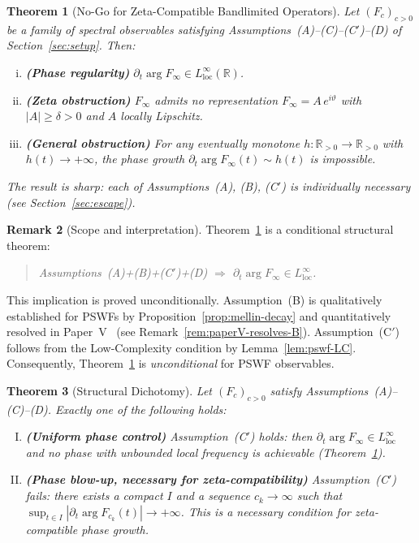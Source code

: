 \documentclass[12pt,a4paper]{amsart}
\newtheorem{theorem}{Theorem}[section]
\theoremstyle{definition}
\newtheorem{remark}[theorem]{Remark}
\begin{document}
\begin{theorem}[No-Go for Zeta-Compatible Bandlimited
Operators]
\label{thm:main}
Let $(F_c)_{c>0}$ be a family of spectral observables
satisfying Assumptions~(A)--(C)--(C$'$)--(D) of
Section~\ref{sec:setup}. Then:
\begin{enumerate}[(i)]
\item \textbf{(Phase regularity)}
$\partial_t \arg F_\infty
\in L^\infty_{\mathrm{loc}}(\mathbb{R})$.
\item \textbf{(Zeta obstruction)}
$F_\infty$ admits no representation
$F_\infty = A\,e^{i\vartheta}$ with
$|A| \ge \delta > 0$ and $A$ locally Lipschitz.
\item \textbf{(General obstruction)}
For any eventually monotone
$h : \mathbb{R}_{>0} \to \mathbb{R}_{>0}$
with $h(t) \to +\infty$, the phase growth
$\partial_t \arg F_\infty(t) \sim h(t)$
is impossible.
\end{enumerate}
The result is sharp: each of
Assumptions~(A), (B), (C$'$) is individually
necessary (see Section~\ref{sec:escape}).
\end{theorem}

\begin{remark}[Scope and interpretation]
\label{rem:scope-theorem}
Theorem~\ref{thm:main} is a conditional structural
theorem:
\begin{quote}
\emph{Assumptions~(A)+(B)+(C$'$)+(D)
$\Rightarrow$
$\partial_t \arg F_\infty
\in L^\infty_{\mathrm{loc}}$.}
\end{quote}
This implication is proved unconditionally.
Assumption~(B) is qualitatively established for PSWFs
by Proposition~\ref{prop:mellin-decay} and
quantitatively resolved in Paper~V~\cite{PaperV}
(see Remark~\ref{rem:paperV-resolves-B}).
Assumption~(C$'$) follows from the Low-Complexity
condition by Lemma~\ref{lem:pswf-LC}.
Consequently, Theorem~\ref{thm:main} is
\emph{unconditional} for PSWF observables.
\end{remark}

\begin{theorem}[Structural Dichotomy]
\label{thm:dichotomy}
Let $(F_c)_{c>0}$ satisfy
Assumptions~(A)--(C)--(D). Exactly one of the
following holds:
\begin{enumerate}[(I)]
\item \textbf{(Uniform phase control)}
Assumption~(C$'$) holds: then
$\partial_t \arg F_\infty
\in L^\infty_{\mathrm{loc}}$ and \emph{no} phase
with unbounded local frequency is achievable
(Theorem~\ref{thm:main}).
\item \textbf{(Phase blow-up, necessary for
zeta-compatibility)}
Assumption~(C$'$) fails: there exists a compact $I$
and a sequence $c_k \to \infty$ such that
$\sup_{t \in I}|\partial_t \arg F_{c_k}(t)|
\to +\infty$. This is a \emph{necessary} condition
for zeta-compatible phase growth.
\end{enumerate}
\end{theorem}
\end{document}
